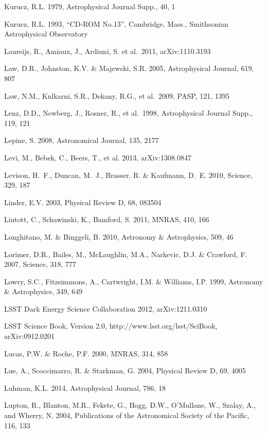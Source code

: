 \documentclass{emulateapj}
\begin{document}
\begin{thebibliography}{}
\bibitem[()]{} Kurucz, R.L. 1979, Astrophysical Journal Supp., 40, 1

\bibitem[()]{} Kurucz, R.L. 1993, ``CD-ROM No.13”, Cambridge, Mass., Smithsonian Astrophysical Observatory

\bibitem[()]{} Laureijs, R., Amiaux, J., Ardiuni, S. et al.~2011, arXiv:1110.3193

\bibitem[()]{} Law, D.R., Johnston, K.V. \& Majewski, S.R. 2005,  Astrophysical Journal, 619, 807

\bibitem[()]{} Law, N.M., Kulkarni, S.R., Dekany, R.G., et al.~2009, PASP, 121, 1395

\bibitem[()]{} Lenz, D.D., Newberg, J., Rosner, R., et al.~1998, Astrophysical Journal Supp., 119, 121

\bibitem[()]{} Lepine, S. 2008, Astronomical Journal, 135, 2177

\bibitem[()]{} Levi, M., Bebek, C., Beers, T., et al. 2013, arXiv:1308.0847

\bibitem[()]{} Levison, H.~F., Duncan, M.~J., Brasser, R. \& Kaufmann, D.~E. 2010, Science, 329, 187

\bibitem[()]{} Linder, E.V. 2003, Physical Review D, 68, 083504
	
\bibitem[()]{} Lintott, C., Schawinski, K., Bamford, S. 2011, MNRAS,
  410, 166

\bibitem[()]{} Longhitano, M. \& Binggeli, B. 2010, Astronomy \& Astrophysics, 509, 46

\bibitem[()]{} Lorimer, D.R., Bailes, M., McLaughlin, M.A., Narkevic, D.J. \& Crawford, F. 2007, Science, 318, 777	

\bibitem[()]{} Lowry, S.C., Fitzsimmons, A., Cartwright, I.M. \& Williams, I.P. 1999, Astronomy \& 
             Astrophysics, 349, 649

\bibitem[()]{} LSST Dark Energy Science Collaboration 2012, arXiv:1211.0310

\bibitem[()]{} LSST Science Book, Version 2.0,
  http://www.lsst.org/lsst/SciBook, arXiv:0912.0201

\bibitem[()]{} Lucas, P.W. \& Roche, P.F. 2000, MNRAS, 314, 858
	
\bibitem[()]{} Lue, A., Scoccimarro, R. \& Starkman, G. 2004, Physical Review D, 69, 4005

\bibitem[()]{} Luhman, K.L. 2014,  Astrophysical Journal, 786, 18 

\bibitem[()]{} Lupton, R., Blanton, M.R., Fekete, G., Hogg, D.W.,
  O'Mullane, W., Szalay, A., and Wherry, N. 2004, Publications of the
  Astronomical Society of the Pacific, 116, 133


\end{thebibliography}
\end{document}

